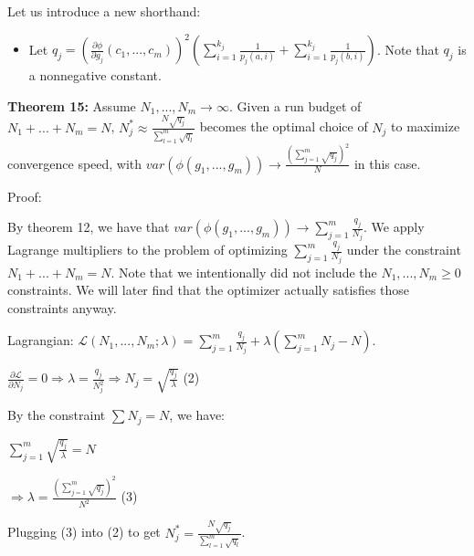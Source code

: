 \documentclass{article}
\begin{document}
Let us introduce a new shorthand:
\begin{itemize}
\item Let $\displaystyle q_{j} =\left(\frac{\partial \phi }{\partial g_{j}}\left( c_{1} ,...,c_{m}\right)\right)^{2}\left(\sum _{i=1}^{k_{j}}\frac{1}{p_{j}\left( a,i\right)} +\sum _{i=1}^{k_{j}}\frac{1}{p_{j}\left( b,i\right)}\right)$. Note that $\displaystyle q_{j}$ is a nonnegative constant.
\end{itemize}



\textbf{Theorem 15:} Assume $\displaystyle N_{1} ,...,N_{m}\rightarrow \infty $. Given a run budget of $\displaystyle N_{1} +...+N_{m} =N$, $\displaystyle N_{j}^{*} \approx \frac{N\sqrt{q_{j}}}{\sum _{l=1}^{m}\sqrt{q_{l}}}$ becomes the optimal choice of $\displaystyle N_{j}$ to maximize convergence speed, with $\displaystyle var\left( \phi \left( g_{1} ,...,g_{m}\right)\right)\rightarrow \frac{\left(\sum _{j=1}^{m}\sqrt{q_{j}}\right)^{2}}{N}$ in this case.



Proof:

By theorem 12, we have that $\displaystyle var\left( \phi \left( g_{1} ,...,g_{m}\right)\right)\rightarrow \sum _{j=1}^{m}\frac{q_{j}}{N_{j}}$. We apply Lagrange multipliers to the problem of optimizing $\displaystyle \sum _{j=1}^{m}\frac{q_{j}}{N_{j}}$ under the constraint $\displaystyle N_{1} +...+N_{m} =N$. Note that we intentionally did not include the $\displaystyle N_{1} ,...,N_{m} \geqslant 0$ constraints. We will later find that the optimizer actually satisfies those constraints anyway.



Lagrangian: $\displaystyle \mathcal{L}\left( N_{1} ,...,N_{m} ;\lambda \right) =\sum _{j=1}^{m}\frac{q_{j}}{N_{j}} +\lambda \left(\sum _{j=1}^{m} N_{j} -N\right)$.

$\displaystyle \frac{\partial \mathcal{L}}{\partial N_{j}} =0\Longrightarrow \lambda =\frac{q_{j}}{N_{j}^{2}} \Longrightarrow N_{j} =\sqrt{\frac{q_{j}}{\lambda }}$ (2)

By the constraint $\displaystyle \sum N_{j} =N$, we have:

$\displaystyle \sum _{j=1}^{m}\sqrt{\frac{q_{j}}{\lambda }} =N$

$\displaystyle \Longrightarrow \lambda =\frac{\left(\sum _{j=1}^{m}\sqrt{q_{j}}\right)^{2}}{N^{2}}$ (3)

Plugging (3) into (2) to get $\displaystyle N_{j}^{*} =\frac{N\sqrt{q_{j}}}{\sum _{l=1}^{m}\sqrt{q_{l}}}$.
\end{document}
